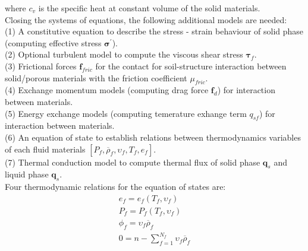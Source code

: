 \documentclass[preprint,12pt]{elsarticle}
\begin{document}
%
%
where $c_v$ is the specific heat at constant volume of the solid materials.
\underline{\hspace{5in}}\\
Closing the systems of equations, the following additional models are needed: \\
(1) A constitutive equation to describe the stress - strain behaviour of solid phase (computing effective stress $\pmb{\sigma}^\prime$). \\
(2) Optional turbulent model to compute the viscous shear stress $\pmb{\tau}_f$.\\
(3) Frictional forces $\pmb{f}_{fric}$ for the contact for soil-structure interaction between solid/porous materials with the friction coefficient $\mu_{fric}$. \\
(4) Exchange momentum models (computing drag force $\pmb{f}_{d}$) for interaction between materials. \\
(5) Energy exchange models (computing temerature exhange term $q_{sf}$) for interaction between materials. \\
(6) An equation of state to establish relations between thermodynamics variables of each fluid materials $[P_{f}, \overline{\rho}_f, \upsilon_f, T_f, e_f]$. \\
(7) Thermal conduction model to compute thermal flux of solid phase $\pmb{q}_s$ and liquid phase $\pmb{q}_s$.\\
Four thermodynamic relations for the equation of states are:
%
%
\begin{equation}
\begin{gathered}
  e_f =  e_f (T_f, \upsilon_f)\\
 P_f =  P_f(T_f, \upsilon_f)\\
  \phi_f = \upsilon_f \overline{\rho}_f\\
  0 = n - \sum_{f=1}^{N_f} \upsilon_f \overline{\rho}_f\\
\end {gathered}
\end {equation}
%
%
\end{document}
